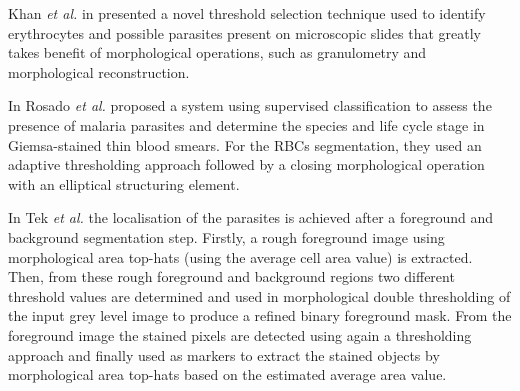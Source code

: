 \documentclass[sensors,review,submit,moreauthors,pdftex,10pt,a4paper]{mdpi}
\begin{document}
Khan \emph{et al.} in \cite{Khan2011} presented a novel threshold selection technique used to identify erythrocytes and possible parasites present on microscopic slides that greatly takes benefit of morphological operations, such as granulometry and morphological reconstruction.

In \cite{Rosado2017} Rosado \emph{et al.} proposed a system using supervised classification to assess the presence of malaria parasites and determine the species and life cycle stage in Giemsa-stained thin blood smears. For the RBCs segmentation, they used an adaptive thresholding approach followed by a closing morphological operation with an elliptical structuring element.


In \cite{Tek2010} Tek \emph{et al.} the localisation of the parasites is achieved after a foreground and background segmentation step. Firstly, a rough foreground image using morphological area top-hats (using the average cell area value) is extracted. Then, from these rough foreground and background regions two different threshold values are determined and used in morphological double thresholding of the input grey level image to produce a refined binary foreground mask. From the foreground image the stained pixels are detected using again a thresholding approach and finally used as markers to extract the stained objects by morphological area top-hats based on the estimated average area value.
\end{document}
